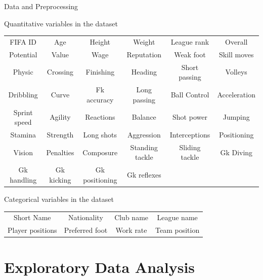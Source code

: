 \documentclass[aspectratio=169,xcolor=dvipsnames]{beamer}
\begin{document}
\begin{frame}{Data and Preprocessing}
\begin{small}
\begin{block}{Quantitative variables in the dataset}
\begin{table}[ht]
\centering
\begin{tabular}{cccccc}
    FIFA ID & Age & Height & Weight & League rank & Overall\\ 
    Potential & Value & Wage & Reputation & Weak foot & Skill moves\\
    Physic & Crossing & Finishing & Heading & Short passing & Volleys\\
    Dribbling & Curve & Fk accuracy & Long passing & Ball Control & Acceleration\\
    Sprint speed & Agility & Reactions & Balance& Shot power&  Jumping\\   
    Stamina & Strength & Long shots & Aggression & Interceptions& Positioning\\
    Vision&  Penalties & Composure & Standing tackle& Sliding tackle & Gk Diving\\
    Gk handling & Gk kicking& Gk positioning & Gk reflexes
\end{tabular}
\end{table}
\end{block}
\end{small}
\begin{small}
\begin{block}{Categorical variables in the dataset}
\begin{table}[ht]
\centering
\begin{tabular}{cccc}
  Short Name & Nationality & Club name & League name\\
  Player positions & Preferred foot & Work rate & Team position
\end{tabular}
\end{table}
\end{block}
\end{small}
\end{frame}


\section{Exploratory Data Analysis}
\end{document}
